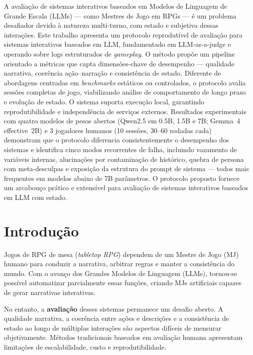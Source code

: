\documentclass[12pt]{article}
\begin{document}
\begin{resumo}
A avaliação de sistemas interativos baseados em Modelos de Linguagem de Grande Escala (LLMs) --- como Mestres de Jogo em RPGs --- é um problema desafiador devido à natureza multi-turno, com estado e subjetiva dessas interações. Este trabalho apresenta um protocolo reprodutível de avaliação para sistemas interativos baseados em LLM, fundamentado em LLM-as-a-judge e operando sobre logs estruturados de \textit{gameplay}. O método propõe um pipeline orientado a métricas que capta dimensões-chave de desempenho --- qualidade narrativa, coerência ação--narração e consistência de estado. Diferente de abordagens centradas em \textit{benchmarks} estáticos ou controlados, o protocolo avalia sessões completas de jogo, viabilizando análise de comportamento de longo prazo e evolução de estado. O sistema suporta execução local, garantindo reprodutibilidade e independência de serviços externos. Resultados experimentais com quatro modelos de pesos abertos (Qwen2.5 em 0.5B, 1.5B e 7B; Gemma~4 effective~2B) e 3 jogadores humanos (10 sessões, 30--60 rodadas cada) demonstram que o protocolo diferencia consistentemente o desempenho dos sistemas e identifica cinco modos recorrentes de falha, incluindo vazamento de variáveis internas, alucinações por contaminação de histórico, quebra de persona com meta-desculpas e exposição da estrutura do prompt de sistema --- todos mais frequentes em modelos abaixo de 7B parâmetros. O protocolo proposto fornece um arcabouço prático e extensível para avaliação de sistemas interativos baseados em LLM com estado.
\end{resumo}


\section{Introdução}

Jogos de RPG de mesa (\textit{tabletop RPG}) dependem de um Mestre de Jogo (MJ) humano para conduzir a narrativa, arbitrar regras e manter a consistência do mundo. Com o avanço dos Grandes Modelos de Linguagem (LLMs), tornou-se possível automatizar parcialmente essas funções, criando MJs artificiais capazes de gerar narrativas interativas.

No entanto, a \textbf{avaliação} desses sistemas permanece um desafio aberto. A qualidade narrativa, a coerência entre ações e descrições e a consistência de estado ao longo de múltiplas interações são aspectos difíceis de mensurar objetivamente. Métodos tradicionais baseados em avaliação humana apresentam limitações de escalabilidade, custo e reprodutibilidade.
\end{document}
